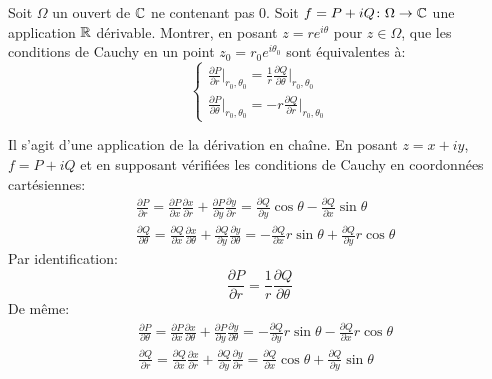 \documentclass[a4paper, 12pt]{amsart}
\begin{document}
\begin{fex}
Soit $\Omega$ un ouvert de $\mathbb{C}$ ne contenant pas $0.$ Soit $f=P + i Q \colon \Omega \to \mathbb{C}$ une application $\mathbb{R}$ dérivable. Montrer, en posant $z=re^{i\theta}$ pour $z \in \Omega$, que les conditions de Cauchy en un point $z_0 = r_0 e^{i \theta_0}$ sont équivalentes à:
\[
\begin{cases}
    \frac{\partial P}{\partial r}\vert_{r_0,\theta_0} = \frac{1}{r}\frac{\partial Q}{\partial \theta}\vert_{r_0,\theta_0} \\
    \frac{\partial P}{\partial \theta}\vert_{r_0,\theta_0} =- r\frac{\partial Q}{\partial r}\vert_{r_0,\theta_0}
\end{cases}
\]
\end{fex}
Il s'agit d'une application de la dérivation en chaîne. En posant $z = x + i y$, $f = P + i Q$ 
et en supposant vérifiées les conditions de Cauchy en coordonnées cartésiennes:
\begin{equation}
\begin{split}
    & \frac{\partial P}{\partial r} = \frac{\partial P}{\partial x}\frac{\partial x}{\partial r} +\frac{\partial P}{\partial y}\frac{\partial y}{\partial r}
    = \frac{\partial Q}{\partial y} \cos \theta -\frac{\partial Q}{\partial x} \sin \theta\\
    & \frac{\partial Q}{\partial \theta} = \frac{\partial Q}{\partial x}\frac{\partial x}{\partial \theta} + \frac{\partial Q}{\partial y}\frac{\partial y}{\partial \theta} = -\frac{\partial Q}{\partial x} r \sin\theta + \frac{\partial Q}{\partial y} r \cos \theta
\end{split}
\end{equation}
Par identification:
\[
\frac{\partial P}{\partial r} = \frac{1}{r}\frac{\partial Q}{\partial \theta}
\]
De même:
\begin{equation}
\begin{split}
    & \frac{\partial P}{\partial \theta} = \frac{\partial P}{\partial x}\frac{\partial x}{\partial \theta} +\frac{\partial P}{\partial y}\frac{\partial y}{\partial \theta}
    = - \frac{\partial Q}{\partial y} r \sin \theta -\frac{\partial Q}{\partial x} r \cos \theta\\
    & \frac{\partial Q}{\partial r} = \frac{\partial Q}{\partial x}\frac{\partial x}{\partial r} + \frac{\partial Q}{\partial y}\frac{\partial y}{\partial r} = \frac{\partial Q}{\partial x}  \cos \theta + \frac{\partial Q}{\partial y} \sin \theta
\end{split}
\end{equation}
\end{document}
